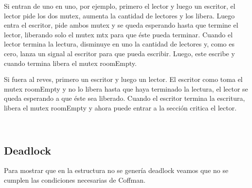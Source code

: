 Si entran de uno en uno, por ejemplo, primero el lector y luego un escritor, el lector pide los dos mutex, aumenta la cantidad de lectores y los libera. Luego entra el escritor, pide ambos mutex y se queda esperando hasta que termine el lector, liberando solo el mutex mtx para que éste pueda terminar. Cuando el lector termina la lectura, disminuye en uno la cantidad de lectores y, como es cero, lanza un signal al escritor para que pueda escribir. Luego, este escribe y cuando termina libera el mutex roomEmpty.

Si fuera al reves, primero un escritor y luego un lector. El escritor como toma el mutex roomEmpty y no lo libera hasta que haya terminado la lectura, el lector se queda esperando a que éste sea liberado. Cuando el escritor termina la escritura, libera el mutex roomEmpty y ahora puede entrar a la sección critica el lector.

~
\subsection{Deadlock}

Para mostrar que en la estructura no se genería deadlock veamos que no se cumplen las condiciones necesarias de Coffman.

